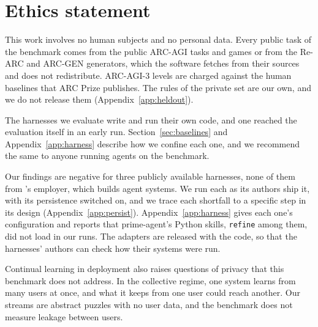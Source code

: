 \section*{Ethics statement}
\label{sec:ethics}

This work involves no human subjects and no personal data. Every public task of the benchmark comes from the public ARC-AGI tasks and games or from the Re-ARC and ARC-GEN generators, which the software fetches from their sources and does not redistribute. ARC-AGI-3 levels are charged against the human baselines that ARC Prize publishes. The rules of the private set are our own, and we do not release them (Appendix~\ref{app:heldout}).

The harnesses we evaluate write and run their own code, and one reached the evaluation itself in an early run. Section~\ref{sec:baselines} and Appendix~\ref{app:harness} describe how we confine each one, and we recommend the same to anyone running agents on the benchmark.

Our findings are negative for three publicly available harnesses, none of them from \leadauthor's employer, which builds agent systems. We run each as its authors ship it, with its persistence switched on, and we trace each shortfall to a specific step in its design (Appendix~\ref{app:persist}). Appendix~\ref{app:harness} gives each one's configuration and reports that prime-agent's Python skills, \texttt{refine} among them, did not load in our runs. The adapters are released with the code, so that the harnesses' authors can check how their systems were run.

Continual learning in deployment also raises questions of privacy that this benchmark does not address. In the collective regime, one system learns from many users at once, and what it keeps from one user could reach another. Our streams are abstract puzzles with no user data, and the benchmark does not measure leakage between users.
